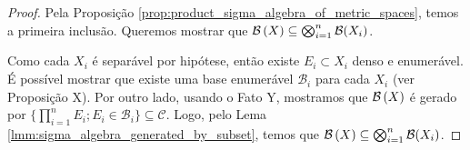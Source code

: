 \begin{proof}
    Pela Proposição \ref{prop:product_sigma_algebra_of_metric_spaces}, temos a primeira inclusão. Queremos mostrar que $\mathcal{B}\left(X\right)\subseteq \bigotimes_{i=1}^{n} \mathcal{B}(X_i)$.  
    
    Como cada $X_i$ é separável por hipótese, então existe $E_i\subset X_i$ denso e enumerável. É possível mostrar que existe uma base enumerável $\mathcal{B}_i$ para cada $X_i$ (ver Proposição X). Por outro lado, usando o Fato Y, mostramos que $\mathcal{B}\left(X\right)$ é gerado por $\{\prod_{i=1}^{n} E_i; E_i\in \mathcal{B}_i \} \subseteq \mathcal{C}$. Logo, pelo Lema \ref{lmm:sigma_algebra_generated_by_subset}, temos que $\mathcal{B}\left(X\right)\subseteq \bigotimes_{i=1}^{n} \mathcal{B}(X_i)$.
\end{proof}